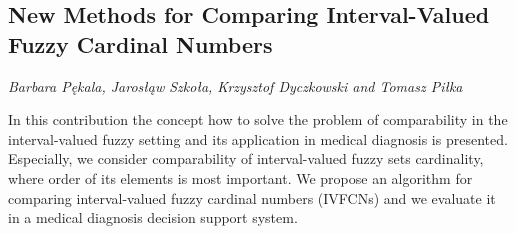\documentclass[../booklet.tex]{subfiles}
\begin{document}
\subsection[New Methods for Comparing Interval-Valued Fuzzy Cardinal Numbers. {\it Barbara Pękala, Jarosłąw Szkoła, Krzysztof Dyczkowski and Tomasz Piłka}]{New Methods for Comparing Interval-Valued Fuzzy Cardinal Numbers}
   

\begin{center}
  {\it Barbara Pękala, Jarosłąw Szkoła, Krzysztof Dyczkowski and Tomasz Piłka}
\end{center}

\vskip 0.8cm


In this contribution the concept how to solve the problem of comparability in the interval-valued fuzzy setting and its application in medical diagnosis is presented. Especially, we consider comparability of interval-valued fuzzy sets cardinality, where order of its elements is most important.  We propose an algorithm for comparing interval-valued fuzzy cardinal numbers (IVFCNs) and we evaluate it in a medical diagnosis decision support system.

\end{document}
